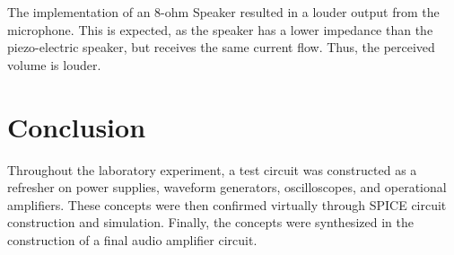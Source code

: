 \documentclass[
	letterpaper, %
	10pt, %
]{CSUniSchoolLabReport}
\begin{document}
The implementation of an 8-ohm Speaker resulted in a louder output from the microphone. This is expected, as the speaker has a lower impedance than the piezo-electric speaker, but receives the same current flow. Thus, the perceived volume is louder.

\newpage

\section{Conclusion}

Throughout the laboratory experiment, a test circuit was constructed as a refresher on power supplies, waveform generators, oscilloscopes, and operational amplifiers. These concepts were then confirmed virtually through SPICE circuit construction and simulation. Finally, the concepts were synthesized in the construction of a final audio amplifier circuit.
\end{document}
